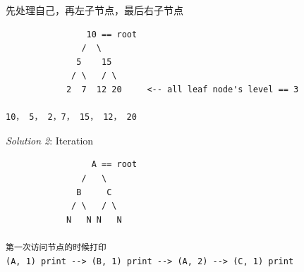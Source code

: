 \documentclass[11pt]{article}
\begin{document}
先处理自己，再左子节点，最后右子节点

\begin{verbatim}
                10 == root
               /  \
              5    15
             / \   / \
            2  7  12 20     <-- all leaf node's level == 3

10， 5， 2，7， 15， 12， 20
\end{verbatim}

\emph{Solution 2}: Iteration

\begin{verbatim}
                 A == root
               /   \
              B     C
             / \   / \ 
            N   N N   N     

第一次访问节点的时候打印
(A, 1) print --> (B, 1) print --> (A, 2) --> (C, 1) print
\end{verbatim}
\end{document}

